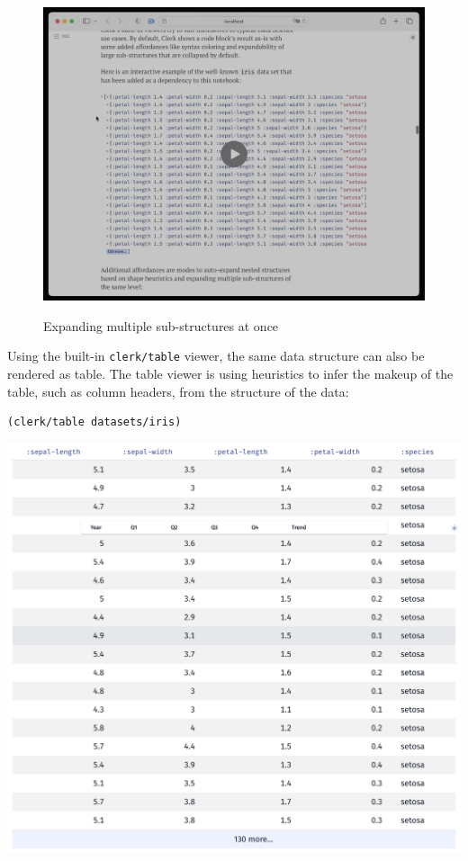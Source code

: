 \documentclass[sigconf,screen]{acmart}
\newcommand{\passthrough}[1]{#1}
\begin{document}
\begin{figure}
\hypertarget{expanding-multiple-sub-structures-at-once}{%
\centering
\href{https://cdn.nextjournal.com/data/QmciJrXQguekgeX6LsXUmvNthadkN2Eu4RMpMXzbKN6JDg?content-type=video/mp4}{\includegraphics{images/expanding-multiple-sub-structures-at-once.png}}
\caption{Expanding multiple sub-structures at once}\label{expanding-multiple-sub-structures-at-once}
}
\end{figure}

Using the built-in \passthrough{\lstinline!clerk/table!} viewer, the same data structure can also be rendered as table. The table viewer is using heuristics to infer the makeup of the table, such as column headers, from the structure of the data:

\begin{minipage}{\linewidth}
\begin{lstlisting}
(clerk/table datasets/iris)
\end{lstlisting}
\end{minipage}

\includegraphics{images/anon-expr-5dtuc4aWdsThsN1ZehoANzcdjAoyh5-result.png}
\end{document}
